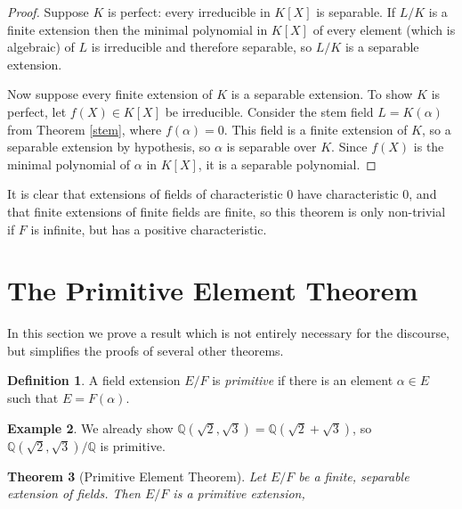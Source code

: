 \documentclass[12pt]{report}
\newtheorem{theorem}{Theorem}[section]
\theoremstyle{definition}
\newtheorem{definition}[theorem]{Definition}
\newtheorem{example}[theorem]{Example}
\newcommand{\QQ}{\mathbb{Q}}
\begin{document}
\begin{proof}
	Suppose $K$ is perfect: every irreducible in $K[X]$ is separable. If $L/K$ is a finite extension then the minimal polynomial in $K[X]$ of every element (which is algebraic) of $L$ is irreducible and therefore separable, so $L/K$ is a separable extension.

	Now suppose every finite extension of $K$ is a separable extension. To show $K$ is perfect, let $f(X) \in K[X]$ be irreducible. Consider the stem field $L = K(\alpha)$ from Theorem \ref{stem}, where $f(\alpha) = 0$. This field is a finite extension of $K$, so a separable extension by hypothesis, so $\alpha$ is separable over $K$. Since $f(X)$ is the minimal polynomial of $\alpha$ in $K[X]$, it is a separable polynomial.
\end{proof}

It is clear that extensions of fields of characteristic 0 have characteristic 0, and that finite extensions of finite fields are finite, so this theorem is only non-trivial if $F$ is infinite, but has a positive characteristic.

\section{The Primitive Element Theorem}

In this section we prove a result which is not entirely necessary for the discourse, but simplifies the proofs of several other theorems.

\begin{definition}
	A field extension $E/F$ is \emph{primitive} if there is an element $\alpha\in E$ such that $E=F(\alpha)$.
\end{definition}

\begin{example}
	We already show $\QQ(\sqrt{2},\sqrt{3})=\QQ(\sqrt{2}+\sqrt{3})$, so $\QQ(\sqrt{2},\sqrt{3})/\QQ$ is primitive.
\end{example}

\begin{theorem}[Primitive Element Theorem]\label{primitive}
	Let $E/F$ be a finite, separable extension of fields. Then $E/F$ is a primitive extension,
\end{theorem}
\end{document}

